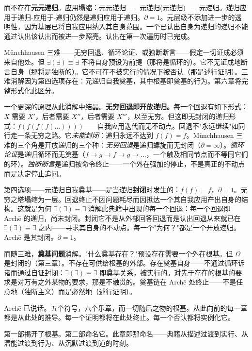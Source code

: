 \documentclass[10pt, openany, oneside]{book}
\begin{document}
而不存在\textbf{元元递归}。应用塌缩：元元递归 $=$ 元递归(元递归) $=$ 元递归。递归应用于递归-应用于-递归仍然是递归应用于递归。$\partial = 1$。元层级不添加进一步的透明性，因为基层已将自我应用纳入其自身范围。一个已认出自身为递归的递归不能通过认出该认出而被进一步照亮。认出在第一次遍历时已完成。

M\"{u}nchhausen 三难——无穷回退、循环论证、或独断断言——假定一切证成必须来自他处。但 $\exists(\exists) \equiv \exists$ 不将自身预设为前提（那将是循环的）。它不无证成地断言自身（那将是独断的）。它不可在不被实行的情况下被否认（那是述行证明）。三难消解因为第四选项存在：元递归自我奠基，其中根基即奠基的行为。第六章将完整形式化此区分。

一个更深的原理从此消解中结晶。\textbf{无穷回退即开放递归。}每一个回退有如下形式：$X$ 需要 $X'$，后者需要 $X''$，后者需要 $X'''$，以至无穷。但这即无封闭的递归形式：$f(f(f(f(\ldots))))$——自我应用迭代而无不动点。回退不"永远继续"如同行走一条无穷之路。它\textit{未能封闭}：递归永远不达到 $f(f) = f$。M\"{u}nchhausen 三难的三个角是开放递归的三个种：\textit{无穷回退}是递归螺旋而无封闭（$\partial = \infty$）。\textit{循环论证}是递归循环而无奠基（$f \to g \to f \to g \to \ldots$，一个触及相同节点而不等同它们的环）。\textit{独断断言}是递归被命令终止——一个外在强加的停止，不是真正的不动点而是决定停止追问。

第四选项——元递归自我奠基——是当递归\textbf{封闭}时发生的：$f(f) = f$，$\partial = 1$。无穷之塔塌缩为一层。回退终止不因问题耗尽而因抵达一个其自我应用产出自身的结构。这就是为何 $\exists(\exists) \equiv \exists$ 消解此典籍中出现的每一个回退：每一个回退即 Arch\={e} 的递归，尚未封闭。封闭它不是从外部回答回退而是认出回退从来就已在 $\exists(\exists) \equiv \exists$ 之内——寻求其自身的不动点。每一个"为何？"都是一个开放递归。Arch\={e} 是其封闭。$\partial = 1$。

而随三难，\textbf{奠基问题}消解。"什么奠基存在？"预设存在需要一个外在根基。但 $\Omega$ 是封闭的（第三章）。不存在可供给根基的外部。存在奠基自身——不通过循环诉诸而通过自证封闭：$\exists(\exists) \equiv \exists$ 即奠基关系，被实行的。对先于存在的根基的要求是对万有之外某物的要求，那是不融贯的。奠基链在 Arch\={e} 处终止——不是任意地（独断主义）而是必然地（述行证明）。

\vspace{1.5em}

Arch\={e} 已说话。五个符号，六个乐章，而一切随后之物的根基。从此向前的每一章都是从此处的推导。每一个证明都将在此处终止。每一个否认都将实例化它。

第一部揭开了根基。第二部命名它。此章即那命名——典籍从描述过渡到实行、从潜能过渡到行为、从沉默过渡到道的时刻。
\end{document}
